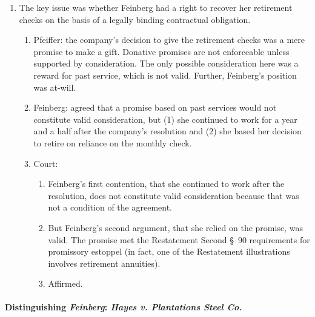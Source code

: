 \begin{enumerate}
    \item The key issue was whether Feinberg had a right to recover her 
    retirement checks on the basis of a legally binding contractual 
    obligation.
    \begin{enumerate}
        \item Pfeiffer: the company's decision to give the retirement checks 
        was a mere promise to make a gift. Donative promises are not 
        enforceable unless supported by consideration. The only possible 
        consideration here was a reward for past service, which is not valid. 
        Further, Feinberg's position was at-will.
        \item Feinberg: agreed that a promise based on past services would not 
        constitute valid consideration, but (1) she continued to work for a 
        year and a half after the company's resolution and (2) she based her 
        decision to retire on reliance on the monthly check.
        \item Court: 
        \begin{enumerate}
            \item Feinberg's first contention, that she continued to work 
            after the resolution, does not constitute valid consideration 
            because that was not a condition of the agreement.
            \item But Feinberg's second argument, that she relied on the 
            promise, was valid. The promise met the Restatement Second \S\ 90 
            requirements for promissory estoppel (in fact, one of the 
            Restatement illustrations involves retirement annuities).
            \item Affirmed.
        \end{enumerate}
    \end{enumerate}
\end{enumerate}

\paragraph{Distinguishing \emph{Feinberg}: \emph{Hayes v. Plantations 
Steel Co.}}

